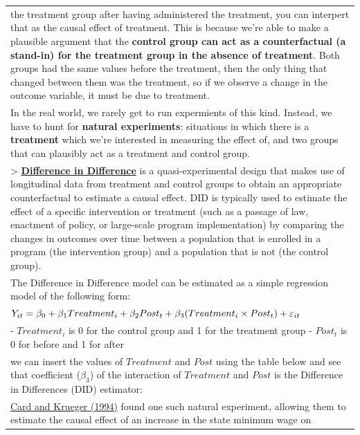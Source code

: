 \documentclass[
  letterpaper,
  DIV=11,
  numbers=noendperiod]{scrreprt}
\begin{document}
\begin{longtable}[]{@{}
  >{\raggedright\arraybackslash}p{}@{}}
the treatment group after having administered the treatment, you can
interpert that as the causal effect of treatment. This is because we're
able to make a plausible argument that the \textbf{control group can act
as a counterfactual (a stand-in) for the treatment group in the absence
of treatment}. Both groups had the same values before the treatment,
then the only thing that changed between them was the treatment, so if
we observe a change in the outcome variable, it must be due to
treatment. \\
In the real world, we rarely get to run expermients of this kind.
Instead, we have to hunt for \textbf{natural experiments}: situations in
which there is a \textbf{treatment} which we're interested in measuring
the effect of, and two groups that can plausibly act as a treatment and
control group. \\
\textgreater{}
\textbf{\href{https://www.publichealth.columbia.edu/research/population-health-methods/difference-difference-estimation\#:~:text=DID\%20relies\%20on\%20a\%20less,individual\%20level\%20is\%20not\%20possible.}{Difference
in Difference}} is a quasi-experimental design that makes use of
longitudinal data from treatment and control groups to obtain an
appropriate counterfactual to estimate a causal effect. DID is typically
used to estimate the effect of a specific intervention or treatment
(such as a passage of law, enactment of policy, or large-scale program
implementation) by comparing the changes in outcomes over time between a
population that is enrolled in a program (the intervention group) and a
population that is not (the control group). \\
The Difference in Difference model can be estimated as a simple
regression model of the following form: \\
\(\huge Y_{it} = \beta_0 + \beta_1 Treatment_i + \beta_2 Post_t + \beta_3 (Treatment_i \times Post_t) + \varepsilon_{it}\) \\
- \(Treatment_i\) is 0 for the control group and 1 for the treatment
group - \(Post_t\) is 0 for before and 1 for after \\
we can insert the values of \(Treatment\) and \(Post\) using the table
below and see that coefficient (\(\beta_3\)) of the interaction of
\(Treatment\) and \(Post\) is the Difference in Differences (DID)
estimator: \\
\href{https://davidcard.berkeley.edu/papers/njmin-aer.pdf}{Card and
Krueger (1994)} found one such natural experiment, allowing them to
estimate the causal effect of an increase in the state minimum wage on

\end{longtable}
\end{document}
